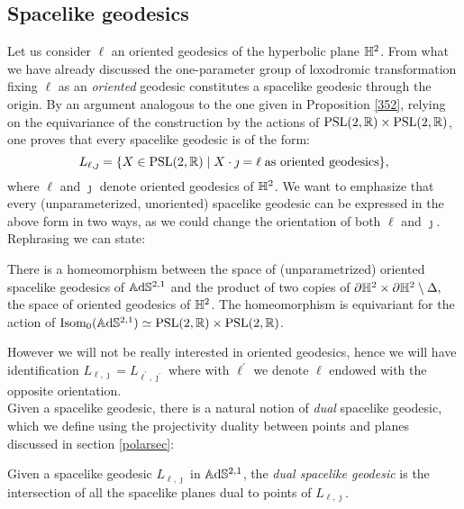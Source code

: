 \subsection{Spacelike geodesics}
Let us consider $\ell$ an oriented geodesics of the hyperbolic plane $\mathbb{H}^2$. From what we have already discussed the one-parameter group of loxodromic transformation fixing $\ell$ as an \textit{oriented} geodesic constitutes a spacelike geodesic through the origin. By an argument analogous to the one given in Proposition \ref{352}, relying on the equivariance of the construction by the actions of $\text{PSL}(2,\mathbb{R})\times\text{PSL}(2,\mathbb{R})$, one proves that every spacelike geodesic is of the form: 
\[
    L_{\ell,\jmath}=\{X\in\text{PSL}(2,\mathbb{R})\;|\;X\cdot\jmath=\ell\;\text{as oriented geodesics}\},
\]
where $\ell$ and $\jmath$ denote oriented geodesics of $\mathbb{H}^2$. We want to emphasize that every (unparameterized, unoriented) spacelike geodesic can be expressed in the above form in two ways, as we could change the orientation of both $\ell$ and $\jmath$. Rephrasing we can state: 
\begin{proposition}\label{353}
    There is a homeomorphism between the space of (unparametrized) oriented spacelike geodesics of $\mathbb{A}\mathrm{d}\mathbb{S}^{2,1}$ and the product of two copies of $\partial\mathbb{H}^2\times\partial\mathbb{H}^2\setminus\Delta,$ the space of oriented geodesics of $\mathbb{H}^2$. The homeomorphism is equivariant for the action of $\text{Isom}_0(\mathbb{A}\mathrm{d}\mathbb{S}^{2,1})\simeq\text{PSL}(2,\mathbb{R})\times\text{PSL}(2,\mathbb{R})$.
\end{proposition}

However we will not be really interested in oriented geodesics, hence we will have identification $L_{\ell,\jmath}=L_{\ell^{\prime},\jmath^{\prime}}$ where with $\ell^{\prime} $ we denote $\ell$ endowed with the opposite orientation.\\
Given a spacelike geodesic, there is a natural notion of \textit{dual} spacelike geodesic, which we define using the projectivity duality between points and planes discussed in section \ref{polarsec}: 
\begin{definition}
    Given a spacelike geodesic $L_{\ell,\jmath}$ in $\mathbb{A}\mathrm{d}\mathbb{S}^{2,1}$, the \textit{dual spacelike geodesic} is the intersection of all the spacelike planes dual to points of $L_{\ell,\jmath}.$  
\end{definition}

